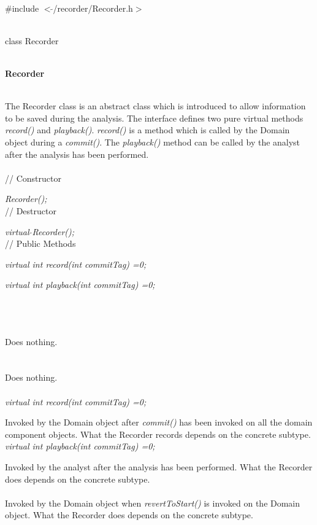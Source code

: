 
   \\
\#include $<\tilde{ }$/recorder/Recorder.h$>$  


  \\
class Recorder 


 \\
{\bf Recorder} 


  \\
\indent The Recorder class is an abstract class which is introduced to allow
information to be saved during the analysis. The interface defines two
pure virtual methods {\em record()} and {\em playback()}. {\em
record()} is a method which is called by the Domain object during a
{\em commit()}. The {\em playback()} method can be called by the analyst after
the analysis has been performed. \\

 \\
// Constructor 

{\em Recorder();}\\ 

// Destructor 

{\em virtual $\tilde{ }$Recorder();}\\ 

// Public Methods  

{\em virtual int record(int commitTag) =0;}

{\em virtual int playback(int commitTag) =0;}

\\ 

  \\
  \\ 
Does nothing.\\

 \\
\\ 
Does nothing. \\

  \\
{\em virtual int record(int commitTag) =0;}

Invoked by the Domain object after {\em commit()} has been invoked on all the
domain component objects. What the Recorder records depends on the
concrete subtype. \\

{\em virtual int playback(int commitTag) =0;}

Invoked by the analyst after the analysis has been performed. What the
Recorder does depends on the concrete subtype. \\

\\ 
Invoked by the Domain object when {\em revertToStart()} is invoked on
the Domain object. What the Recorder does depends on the concrete subtype. 